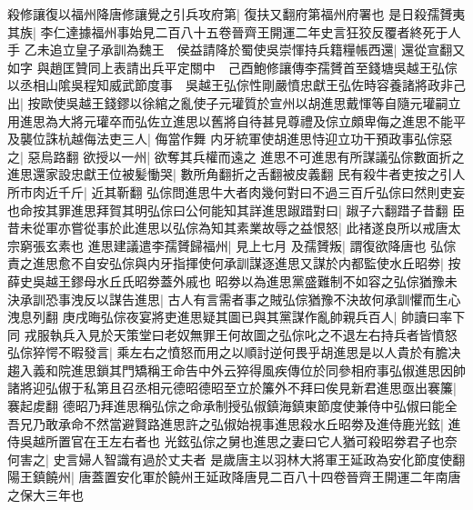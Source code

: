 殺修讓復以福州降唐修讓覺之引兵攻府第|{
	復扶又翻府第福州府署也}
是日殺孺贇夷其族|{
	李仁達據福州事始見二百八十五卷晉齊王開運二年史言狂狡反覆者終死于人手}
乙未追立皇子承訓為魏王　侯益請降於蜀使吳崇惲持兵籍糧帳西還|{
	還從宣翻又如字}
與趙匡贊同上表請出兵平定關中　己酉鮑修讓傳李孺贇首至錢塘吳越王弘倧以丞相山隂吳程知威武節度事　吳越王弘倧性剛嚴憤忠獻王弘佐時容養諸將政非己出|{
	按歐使吳越王錢鏐以徐綰之亂使子元瓘質於宣州以胡進思戴惲等自隨元瓘嗣立用進思為大將元瓘卒而弘佐立進思以舊將自待甚見尊禮及倧立頗卑侮之進思不能平}
及襲位誅杭越侮法吏三人|{
	侮當作舞}
内牙統軍使胡進思恃迎立功干預政事弘倧惡之|{
	惡烏路翻}
欲授以一州|{
	欲奪其兵權而遠之}
進思不可進思有所謀議弘倧數面折之進思還家設忠獻王位被髪慟哭|{
	數所角翻折之舌翻被皮義翻}
民有殺牛者吏按之引人所市肉近千斤|{
	近其靳翻}
弘倧問進思牛大者肉幾何對曰不過三百斤弘倧曰然則吏妄也命按其罪進思拜賀其明弘倧曰公何能知其詳進思踧踖對曰|{
	踧子六翻踖子昔翻}
臣昔未從軍亦嘗從事於此進思以弘倧為知其素業故辱之益恨怒|{
	此禇遂良所以戒唐太宗窮張玄素也}
進思建議遣李孺贇歸福州|{
	見上七月}
及孺贇叛|{
	謂復欲降唐也}
弘倧責之進思愈不自安弘倧與内牙指揮使何承訓謀逐進思又謀於内都監使水丘昭劵|{
	按薛史吳越王鏐母水丘氏昭劵蓋外戚也}
昭劵以為進思黨盛難制不如容之弘倧猶豫未決承訓恐事洩反以謀告進思|{
	古人有言需者事之賊弘倧猶豫不決故何承訓懼而生心洩息列翻}
庚戌晦弘倧夜宴將吏進思疑其圖已與其黨謀作亂帥親兵百人|{
	帥讀曰率下同}
戎服執兵入見於天策堂曰老奴無罪王何故圖之弘倧叱之不退左右持兵者皆憤怒弘倧猝愕不暇發言|{
	乘左右之憤怒而用之以順討逆何畏乎胡進思是以人貴於有膽决}
趨入義和院進思鎖其門矯稱王命告中外云猝得風疾傳位於同參相府事弘俶進思因帥諸將迎弘俶于私第且召丞相元德昭德昭至立於簾外不拜曰俟見新君進思亟出褰簾|{
	褰起䖍翻}
德昭乃拜進思稱弘倧之命承制授弘俶鎮海鎮東節度使兼侍中弘俶曰能全吾兄乃敢承命不然當避賢路進思許之弘俶始視事進思殺水丘昭劵及進侍鹿光鉉|{
	進侍吳越所置官在王左右者也}
光鉉弘倧之舅也進思之妻曰它人猶可殺昭劵君子也奈何害之|{
	史言婦人智識有過於丈夫者}
是歲唐主以羽林大將軍王延政為安化節度使翻陽王鎮饒州|{
	唐蓋置安化軍於饒州王延政降唐見二百八十四卷晉齊王開運二年南唐之保大三年也}


